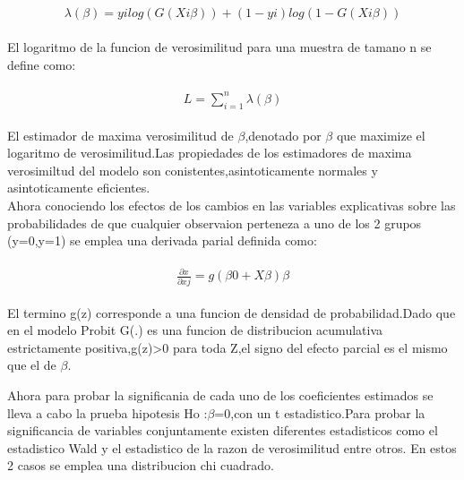 \documentclass[11pt,fleqn]{book} %
\numberwithin{equation}{section} %
\numberwithin{figure}{section} %
\numberwithin{table}{section} %
\begin{document}
\begin{align} 
\begin{split}
\lambda(\beta)= yi log(G(Xi\beta)) + (1-yi)log(1-G(Xi\beta))
\end{split}					
\end{align}

El logaritmo de la funcion de verosimilitud para una muestra de tamano n se define como:  

\begin{align} 
\begin{split}
L= \sum_{i=1}^{n} \lambda(\beta)
\end{split}					
\end{align}

El estimador de maxima verosimilitud de $\beta$,denotado por $\beta$  que maximize el logaritmo de verosimilitud.Las propiedades de los estimadores de maxima verosimiltud del modelo son conistentes,asintoticamente normales y asintoticamente eficientes.
\\
Ahora conociendo los efectos de los cambios en las variables explicativas sobre las probabilidades de que cualquier observaion perteneza a uno de los 2 grupos (y=0,y=1) se emplea una derivada parial definida como:

\begin{align} 
\begin{split}
\frac{\partial x }{\partial xj} = g(\beta 0 +X\beta )\beta
\end{split}					
\end{align}


El termino g(z) corresponde a una funcion de densidad de probabilidad.Dado que en el modelo Probit G(.) es una funcion de distribucion acumulativa estrictamente positiva,g(z)>0 para toda Z,el signo del efecto parcial es el mismo que el de $\beta$.


Ahora para probar la significania de cada uno de los coeficientes estimados se lleva a cabo la prueba hipotesis Ho :$\beta$=0,con un t estadistico.Para probar la significancia de variables conjuntamente existen diferentes estadisticos como el estadistico Wald y el estadistico de la razon de verosimilitud entre otros. En estos 2 casos se emplea una distribucion chi cuadrado.
\end{document}
